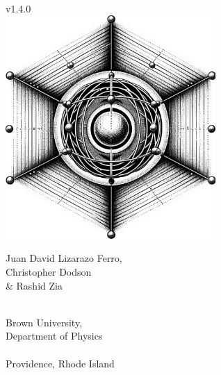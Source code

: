 \documentclass[11pt, twoside,openright]{article}
\newcommand{\qversion}{v1.4.0}
\begin{document}
 

\begin{titlepage} %
    \centering
    \vspace*{\fill}
    
    {\Large\qlanth}\\
    {\large \qversion} \\
    \vspace*{0.5cm}
    \includegraphics[width=0.6\textwidth]{ion_in_lattice.jpg}  %
    \vspace*{0.4cm} %
    
    {\large Juan David Lizarazo Ferro,}\\
    {\large Christopher Dodson}\\
    {\large \& Rashid Zia}\\
    
	\vspace*{\fill}
\end{titlepage}

\newpage

\thispagestyle{empty}
\vspace*{\fill}
\begin{center}
$\,$ \\
{\large Brown University, \\ Department of Physics}\\
\vspace{0.2cm}
\hrulefill \\
\vspace{0.2cm}
Providence, Rhode Island \\
\end{center}
\end{document}
